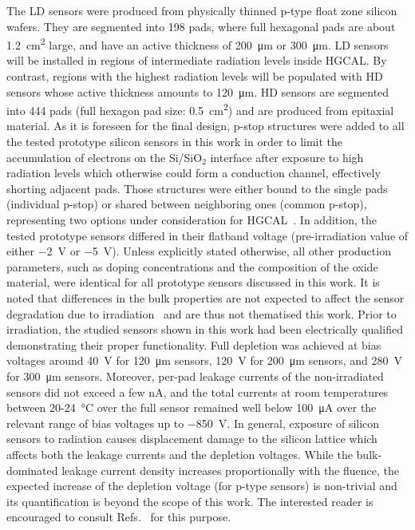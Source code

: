 The LD sensors were produced from physically thinned p-type float zone silicon wafers.
They are segmented into 198 pads, where full hexagonal pads are about \SI{1.2}{\centi\metre\squared} large, and have an active thickness of \SI{200}{\micro\meter} or \SI{300}{\micro\meter}.
LD sensors will be installed in regions of intermediate radiation levels inside HGCAL.
By contrast, regions with the highest radiation levels will be populated with HD sensors whose active thickness amounts to \SI{120}{\micro\meter}.
HD sensors are segmented into 444 pads (full hexagon pad size: \SI{0.5}{\centi\metre\squared}) and are produced from epitaxial material.\newline
As it is foreseen for the final design, p-stop structures were added to all the tested prototype silicon sensors in this work in order to limit the accumulation of electrons on the Si/SiO$_2$ interface after exposure to high radiation levels which otherwise could form a conduction channel, effectively shorting adjacent pads.
Those structures were either bound to the single pads (individual p-stop) or shared between neighboring ones (common p-stop), representing two options under consideration for HGCAL~\cite{Brondolin_2020}.
In addition, the tested prototype sensors differed in their flatband voltage (pre-irradiation value of either \SI{-2}{\volt} or \SI{-5}{\volt}).
Unless explicitly stated otherwise, all other production parameters, such as doping concentrations and the composition of the oxide material, were identical for all prototype sensors discussed in this work.
It is noted that differences in the bulk properties are not expected to affect the sensor degradation due to irradiation~\cite{MOLL199987} and are thus not thematised this work.
Prior to irradiation, the studied sensors shown in this work had been electrically qualified demonstrating their proper functionality.
Full depletion was achieved at bias voltages around \SI{40}{\volt} for \SI{120}{\micro\metre} sensors, \SI{120}{\volt} for \SI{200}{\micro\metre} sensors, and \SI{280}{\volt} for \SI{300}{\micro\meter} sensors. 
Moreover, per-pad leakage currents of the non-irradiated sensors did not exceed a few nA, and the total currents at room temperatures between 20-\SI{24}{\celsius} over the full sensor remained well below \SI{100}{\micro\ampere} over the relevant range of bias voltages up to \SI{-850}{\volt}. %
In general, exposure of silicon sensors to radiation causes displacement damage to the silicon lattice which affects both the leakage currents and the depletion voltages. 
While the bulk-dominated leakage current density increases proportionally with the fluence, the expected increase of the depletion voltage (for p-type sensors) is non-trivial and its quantification is beyond the scope of this work.
The interested reader is encouraged to consult Refs.~\cite{moll:SiDamages,LINDSTROM200330} for this purpose.